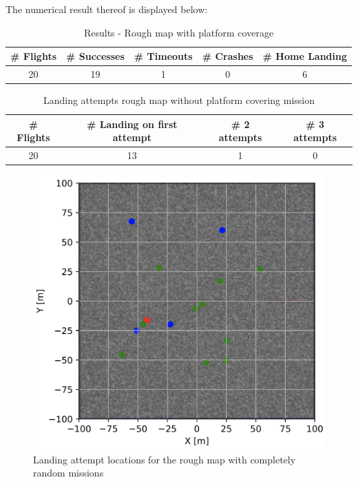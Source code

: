     The numerical result thereof is displayed below:

    \begin{table}[h]
        \begin{center}
         \caption{Results - Rough map with platform coverage}\vspace{1ex}
         \label{tab:result_rough_rand}
         \begin{tabular}{|c|c|c|c|c|}
         \hline
         \# Flights & \# Successes & \# Timeouts & \# Crashes & \# Home Landing\\ \hline \hline
         20 & 19 & 1 & 0 & 6 \\
         \hline
         \end{tabular}
        \end{center}
    \end{table}

    \begin{table}[h]
        \begin{center}
         \caption{Landing attempts rough map without platform covering mission}\vspace{1ex}
         \label{tab:land_nums_rough_rand}
         \begin{tabular}{|c|c|c|c|}
         \hline
         \# Flights & \# Landing on first attempt & \# 2 attempts & \# 3 attempts\\ \hline \hline
         20 & 13 & 1 & 0 \\
         \hline
         \end{tabular}
        \end{center}
    \end{table}

    \begin{figure}[h]
    \centering
    \includegraphics[scale=0.5]{images/evaluation/landing_rough_rand.png}
    \caption{Landing attempt locations for the rough map with completely random missions}
    \label{fig:land_rough_rand}
    \end{figure}

